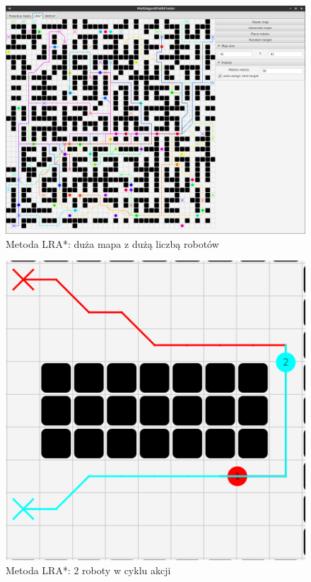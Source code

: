 \begin{figure}
	\centering
	\includegraphics[width=0.8\columnwidth]{img/robopath/lra-bigmap}
	\caption{Metoda LRA*: duża mapa z dużą liczbą robotów}
	\label{fig:app-tech-intellij}
\end{figure}

\begin{figure}
	\centering
	\includegraphics[width=0.8\columnwidth]{img/robopath/lra-cycle}
	\caption{Metoda LRA*: 2 roboty w cyklu akcji}
	\label{fig:app-tech-intellij}
\end{figure}

